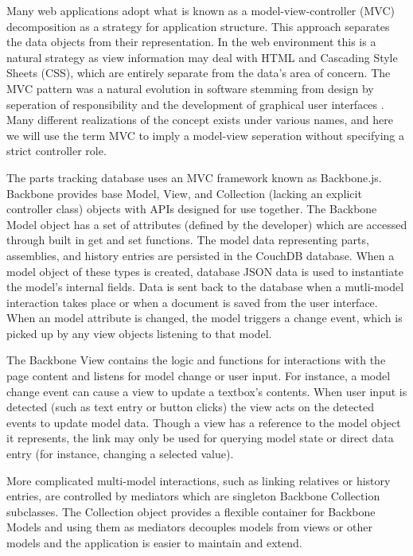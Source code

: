\documentclass[journal]{IEEEtran}
\begin{document}
Many web applications adopt what is known as a model-view-controller (MVC) decomposition
as a strategy for application structure. This approach separates the data objects from
their representation. In the web environment this is a natural strategy as view information
may deal with HTML and Cascading Style Sheets (CSS), which are entirely separate from the data's area of concern.
The MVC pattern was a natural evolution in software stemming from design by
seperation of responsibility and the development of graphical user interfaces \cite{krasner1988description}. Many different realizations
of the concept exists under various names, and here we will use the term MVC to imply
a model-view seperation without specifying a strict controller role.

The parts tracking database uses an MVC framework known as Backbone.js. Backbone provides
base Model, View, and Collection (lacking an explicit controller class)
objects with APIs designed for use together. 
The Backbone Model 
object has a set of attributes (defined by the developer) which are accessed through
built in get and set functions.
The model data representing parts, assemblies, and history entries are persisted in 
the CouchDB database. 
When a model object of these types is created, database JSON data is used to instantiate the model's
internal fields.
Data is sent back to the
database when a mutli-model interaction takes place or when a document is saved from the user interface.
When an model attribute is changed, the model triggers a change event, which is picked
up by any view objects listening to that model.

The Backbone View contains the logic and functions for interactions with the page content
and listens for model change or user input.
For instance, a model change event can cause a view to update a textbox's contents.
When user input is detected (such as text entry or button clicks) the view acts 
on the detected events to update model data.
Though a view has a reference to the model object it represents,
the link may only be used for querying model state or direct data entry (for instance,
changing a selected value).

More complicated multi-model interactions, such as linking relatives or history entries, are controlled by
mediators which are singleton Backbone Collection subclasses. The Collection object provides a
flexible container for Backbone Models and using them as mediators
decouples models from views or other models and the
application is easier to maintain and extend. 
\end{document}
